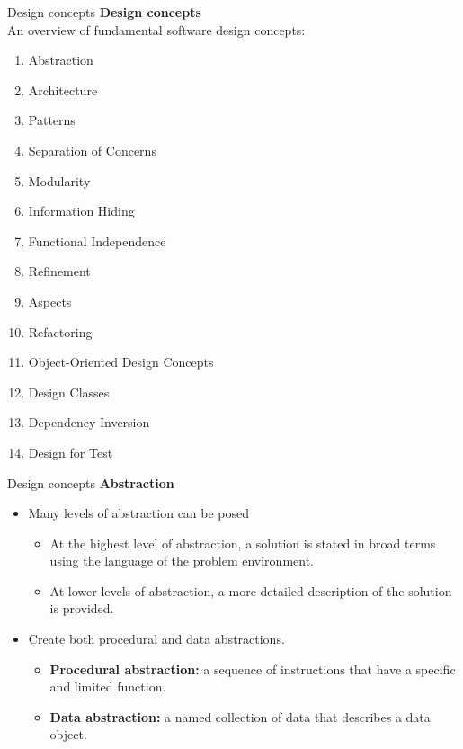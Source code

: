 \documentclass{beamer}
\begin{document}
\begin{frame}{Design concepts}
	\textbf{Design concepts}\\An overview of fundamental software design concepts:
\begin{enumerate}
	\item Abstraction
	\item Architecture
	\item Patterns
\item Separation of Concerns
\item Modularity
	\item Information Hiding
	\item Functional Independence
\item Refinement
\item Aspects
\item Refactoring
\item Object-Oriented Design Concepts
\item Design Classes
\item Dependency Inversion
\item Design for Test
\end{enumerate}

\end{frame}
\begin{frame}{Design concepts}
	\textbf{Abstraction}
	\begin{itemize}
		\item Many levels of abstraction can be posed
		\begin{itemize}
			\item At the highest level of abstraction, a solution is stated in broad terms using 
			the language of the problem environment. 
			\item At lower levels of abstraction, a more detailed description of the solution is 
			provided.
		\end{itemize}
	\item Create both procedural and data abstractions.
	\begin{itemize}
		\item \textbf{Procedural abstraction:} a sequence of instructions that have a specific 
		and limited function.
		\item \textbf{Data abstraction:} a named collection of data that describes a data 
			object. 
	\end{itemize}
	\end{itemize}
\end{frame}
\end{document}
